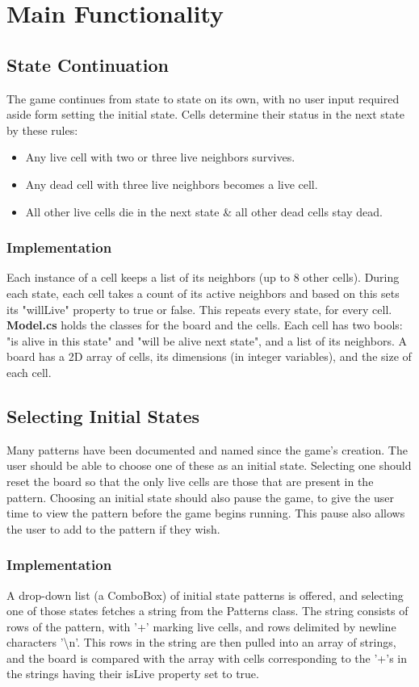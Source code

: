 \documentclass[12pt, letterpaper]{article}
\begin{document}
\newpage
\section*{Main Functionality}
\subsection*{State Continuation}
The game continues from state to state on its own, with no user input required aside form setting the initial state. Cells determine their status in the next state by these rules: 
\begin{itemize}
\item{Any live cell with two or three live neighbors survives.}
\item{Any dead cell with three live neighbors becomes a live cell.}
\item{All other live cells die in the next state \& all other dead cells stay dead.}
\end{itemize}
\subsubsection*{Implementation}
Each instance of a cell keeps a list of its neighbors (up to 8 other cells). During each state, each cell takes a count of its active neighbors and based on this sets its "willLive" property to true or false. This repeats every state, for every cell. \textbf{Model.cs} holds the classes for the board and the cells. Each cell has two bools: "is alive in this state" and "will be alive next state", and a list of its neighbors. A board has a 2D array of cells, its dimensions (in integer variables), and the size of each cell.

\subsection*{Selecting Initial States}
Many patterns have been documented and named since the game's creation. The user should be able to choose one of these as an initial state. Selecting one should reset the board so that the only live cells are those that are present in the pattern. Choosing an initial state should also pause the game, to give the user time to view the pattern before the game begins running. This pause also allows the user to add to the pattern if they wish. 
\subsubsection*{Implementation}
A drop-down list (a ComboBox) of initial state patterns is offered, and selecting one of those states fetches a string from the Patterns class. The string consists of rows of the pattern, with '+' marking live cells, and rows delimited by newline characters '\textbackslash n'. This rows in the string are then pulled into an array of strings, and the board is compared with the array with cells corresponding to the '+'s in the strings having their isLive property set to true. 
\end{document}
